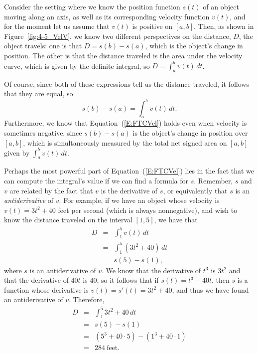 Consider the setting where we know the position function $s(t)$ of an object moving along an axis, as well as its corresponding velocity function $v(t)$, and for the moment let us assume that $v(t)$ is positive on $[a,b]$.  Then, as shown in Figure~\ref{fig:4-5_VelV}, we know two different perspectives on the distance, $D$, the object travels: one is that $D = s(b) - s(a)$, which is the object's change in position.  The other is that the distance traveled is the area under the velocity curve, which is given by the definite integral, so $D = \int_a^b v(t) \, dt$.

Of course, since both of these expressions tell us the distance traveled, it follows that they are equal, so
\begin{equation} \label{E:FTCVel}
s(b) - s(a) = \int_a^b v(t) \, dt.
\end{equation}
Furthermore, we know that Equation~(\ref{E:FTCVel}) holds even when velocity is sometimes negative, since $s(b) - s(a)$ is the object's change in position over $[a,b]$, which is simultaneously measured by the total net signed area on $[a,b]$ given by $\int_a^b v(t) \, dt$.

Perhaps the most powerful part of Equation~(\ref{E:FTCVel}) lies in the fact that we can compute the integral's value if we can find a formula for $s$.  Remember, $s$ and $v$ are related by the fact that $v$ is the derivative of $s$, or equivalently that $s$ is an \emph{antiderivative} of $v$.  For example, if we have an object whose velocity is $v(t) = 3t^2 + 40$ feet per second (which is always nonnegative), and wish to know the distance traveled on the interval $[1,5]$, we have that
\begin{eqnarray*}
D & = & \int_1^5 v(t) \,dt \\
& = & \int_1^5 (3t^2 + 40) \, dt \\
& = & s(5) - s(1),
\end{eqnarray*}
where $s$ is an antiderivative of $v$.  We know that the derivative of $t^3$ is $3t^2$ and that the derivative of $40t$ is $40$, so it follows that if $s(t) = t^3 + 40t$, then $s$ is a function whose derivative is $v(t) = s'(t) = 3t^2 + 40$, and thus we have found an antiderivative of $v$.  Therefore,
\begin{eqnarray*}
D & = & \int_1^5 3t^2 + 40 \, dt \\
& = & s(5) - s(1) \\
& = & (5^3 + 40 \cdot 5) - (1^3 + 40\cdot 1) \\
& = & 284 \ \mbox{feet}.
\end{eqnarray*} 

